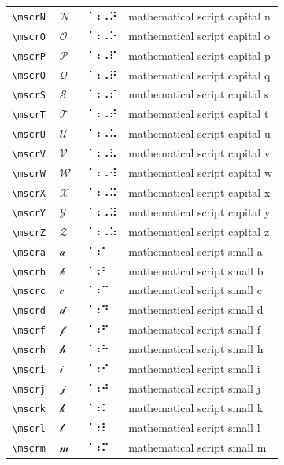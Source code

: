 \documentclass[oneside]{article}
\begin{document}
\begin{longtable}{llll}
\verb|\mscrN| & $\mscrN$ &  ⠈⠰⠠⠝  & {mathematical script capital n} \\[2ex]
\verb|\mscrO| & $\mscrO$ &  ⠈⠰⠠⠕  & {mathematical script capital o} \\[2ex]
\verb|\mscrP| & $\mscrP$ &  ⠈⠰⠠⠏  & {mathematical script capital p} \\[2ex]
\verb|\mscrQ| & $\mscrQ$ &  ⠈⠰⠠⠟  & {mathematical script capital q} \\[2ex]
\verb|\mscrS| & $\mscrS$ &  ⠈⠰⠠⠎  & {mathematical script capital s} \\[2ex]
\verb|\mscrT| & $\mscrT$ &  ⠈⠰⠠⠞  & {mathematical script capital t} \\[2ex]
\verb|\mscrU| & $\mscrU$ &  ⠈⠰⠠⠥  & {mathematical script capital u} \\[2ex]
\verb|\mscrV| & $\mscrV$ &  ⠈⠰⠠⠧  & {mathematical script capital v} \\[2ex]
\verb|\mscrW| & $\mscrW$ &  ⠈⠰⠠⠺  & {mathematical script capital w} \\[2ex]
\verb|\mscrX| & $\mscrX$ &  ⠈⠰⠠⠭  & {mathematical script capital x} \\[2ex]
\verb|\mscrY| & $\mscrY$ &  ⠈⠰⠠⠽  & {mathematical script capital y} \\[2ex]
\verb|\mscrZ| & $\mscrZ$ &  ⠈⠰⠠⠵  & {mathematical script capital z} \\[2ex]
\verb|\mscra| & $\mscra$ &  ⠈⠰⠁  & {mathematical script small a} \\[2ex]
\verb|\mscrb| & $\mscrb$ &  ⠈⠰⠃  & {mathematical script small b} \\[2ex]
\verb|\mscrc| & $\mscrc$ &  ⠈⠰⠉  & {mathematical script small c} \\[2ex]
\verb|\mscrd| & $\mscrd$ &  ⠈⠰⠙  & {mathematical script small d} \\[2ex]
\verb|\mscrf| & $\mscrf$ &  ⠈⠰⠋  & {mathematical script small f} \\[2ex]
\verb|\mscrh| & $\mscrh$ &  ⠈⠰⠓  & {mathematical script small h} \\[2ex]
\verb|\mscri| & $\mscri$ &  ⠈⠰⠊  & {mathematical script small i} \\[2ex]
\verb|\mscrj| & $\mscrj$ &  ⠈⠰⠚  & {mathematical script small j} \\[2ex]
\verb|\mscrk| & $\mscrk$ &  ⠈⠰⠅  & {mathematical script small k} \\[2ex]
\verb|\mscrl| & $\mscrl$ &  ⠈⠰⠇  & {mathematical script small l} \\[2ex]
\verb|\mscrm| & $\mscrm$ &  ⠈⠰⠍  & {mathematical script small m} \\[2ex]

\end{longtable}
\end{document}
